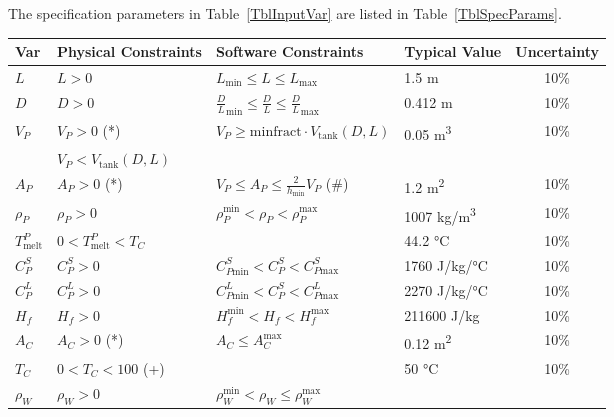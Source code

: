 \documentclass[12pt]{article}
\begin{document}
The specification parameters in Table~\ref{TblInputVar} are listed in
Table~\ref{TblSpecParams}.

\begin{table}[!h]
  \caption{Input Variables} \label{TblInputVar}
  \renewcommand{\arraystretch}{1.2}
\noindent \begin{longtable*}{l l l l c} 
  \toprule
  \textbf{Var} & \textbf{Physical Constraints} & \textbf{Software Constraints} &
                             \textbf{Typical Value} & \textbf{Uncertainty}\\
  \midrule 
  $L$ & $L > 0$ & $L_{\text{min}} \leq L \leq L_{\text{max}}$ & 1.5 \si[per-mode=symbol] {\metre} & 10\%
  \\
  $D$ & $D > 0$ & ${\frac{D}{L}}_\text{min} \leq \frac{D}{L} \leq {\frac{D}{L}}_\text{max}$ 
	& 0.412 \si[per-mode=symbol] {\metre} & 10\%
  \\
  $V_P$ & $V_P > 0$ (*) & $ V_P \geq \text{minfract} \cdot V_{\text{tank}}(D, L) $ &
	0.05 \si[per-mode=symbol] {\cubic\metre} & 10\%
  \\
  & $V_P < V_{\text{tank}}(D, L)$ & & & 
  \\
  $A_P$ & $A_P > 0$ (*) & $V_P \leq A_P \leq \frac{2}{h_\text{min}} V_P$ (\#) & 1.2
       \si[per-mode=symbol] {\square\metre} & 10\%
  \\
  $\rho_P$ & $\rho_P > 0$ & $\rho_P^{\text{min}} < \rho_P < \rho_P^{\text{max}}$ & 1007 \si[per-mode=symbol]
                            {\kilogram\per\cubic\metre} & 10\%
  \\
  $T_\text{melt}^{P}$ 	& $0 < T_\text{melt}^{P} < T_C$ & &  44.2 
	\si[per-mode=symbol] {\celsius} & 10\%
  \\
  $C_P^S$ & $C_P^S > 0$ & $C_{P\text{min}}^S < C_P^S < C_{P\text{max}}^S$ & 1760 
	\si[per-mode=symbol] {\joule\per\kilo\gram\per\celsius} & 10\%
  \\
  $C_P^L$ & $C_P^L > 0$ & $C_{P\text{min}}^L < C_P^S < C_{P\text{max}}^L$ & 2270 
	\si[per-mode=symbol] {\joule\per\kilo\gram\per\celsius} & 10\%
  \\
  $H_f$ & $H_f > 0$ & $H_f^{\text{min}} < H_f < H_f^{\text{max}}$ & 211600 
	\si[per-mode=symbol] {\joule\per\kilo\gram} & 10\%
  \\
  $A_C$ & $A_C > 0$ (*) & $A_C \leq A_C^{\text{max}}$ & 0.12 \si[per-mode=symbol] {\square\metre} & 10\%
  \\
  $T_C$ & $0 < T_C < 100$ (+)	& & 50 \si[per-mode=symbol] {\celsius} & 10\%
  \\
  $\rho_W$ & $\rho_W > 0$ & $\rho_W^{\text{min}} < \rho_W \leq \rho_W^{\text{max}}$ 

\end{longtable*}
\end{table}
\end{document}
